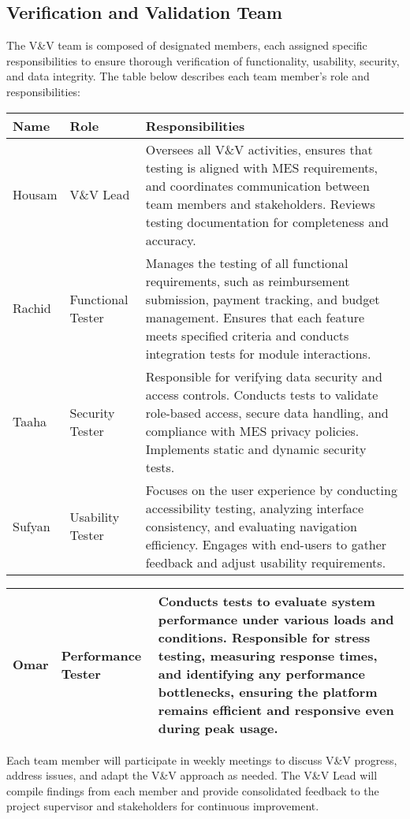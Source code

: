 \documentclass[12pt, titlepage]{article}
\begin{document}
\subsection{Verification and Validation Team}
The V\&V team is composed of designated members, each assigned specific responsibilities to ensure thorough verification of functionality, usability, security, and data integrity. The table below describes each team member's role and responsibilities:

\begin{tabularx}{\textwidth}{|X|X|X|}
    \hline
    \textbf{Name} & \textbf{Role} & \textbf{Responsibilities} \\
    \hline
    Housam & V\&V Lead & Oversees all V\&V activities, ensures that testing is aligned with MES requirements, and coordinates communication between team members and stakeholders. Reviews testing documentation for completeness and accuracy. \\
    \hline
    Rachid & Functional Tester & Manages the testing of all functional requirements, such as reimbursement submission, payment tracking, and budget management. Ensures that each feature meets specified criteria and conducts integration tests for module interactions. \\
    \hline
    Taaha & Security Tester & Responsible for verifying data security and access controls. Conducts tests to validate role-based access, secure data handling, and compliance with MES privacy policies. Implements static and dynamic security tests. \\
    \hline
    Sufyan & Usability Tester & Focuses on the user experience by conducting accessibility testing, analyzing interface consistency, and evaluating navigation efficiency. Engages with end-users to gather feedback and adjust usability requirements. \\
    \hline
  \end{tabularx}

\pagebreak

  \begin{tabularx}{\textwidth}{|X|X|X|}
    Omar & Performance Tester & Conducts tests to evaluate system performance under various loads and conditions. Responsible for stress testing, measuring response times, and identifying any performance bottlenecks, ensuring the platform remains efficient and responsive even during peak usage. \\
    \hline
\end{tabularx}

Each team member will participate in weekly meetings to discuss V\&V progress, address issues, and adapt the V\&V approach as needed. The V\&V Lead will compile findings from each member and provide consolidated feedback to the project supervisor and stakeholders for continuous improvement.
\end{document}

